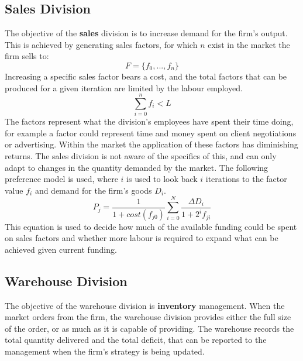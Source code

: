 \documentclass[11pt]{article}
\begin{document}
\subsection{Sales Division}
The objective of the \textbf{sales} division is to increase demand for the firm's output. This is achieved by generating sales factors, for which $ n $ exist in the market the firm sells to:
\[
	F = \{ f_0, ..., f_n \}
\]
Increasing a specific sales factor bears a cost, and the total factors that can be produced for a given iteration are limited by the labour employed.
\[
	\sum_{i=0}^{n} f_i < L
\]
The factors represent what the division's employees have spent their time doing, for example a factor could represent time and money spent on client negotiations or advertising. Within the market the application of these factors has diminishing returns. The sales division is not aware of the specifics of this, and can only adapt to changes in the quantity demanded by the market. The following preference model is used, where $ i $ is used to look back $ i $ iterations to the factor value $ f_i $ and demand for the firm's goods $ D_i $.
\[
	P_j = \frac{1}{1 + cost(f_{j0})} \sum_{i=0}^{N} \frac{\Delta D_i}{1 + 2^i f_{ji}}
\]
This equation is used to decide how much of the available funding could be spent on sales factors and whether more labour is required to expand what can be achieved given current funding.

\subsection{Warehouse Division}
The objective of the warehouse division is \textbf{inventory} management. When the market orders from the firm, the warehouse division provides either the full size of the order, or as much as it is capable of providing. The warehouse records the total quantity delivered and the total deficit, that can be reported to the management when the firm's strategy is being updated.
\end{document}
